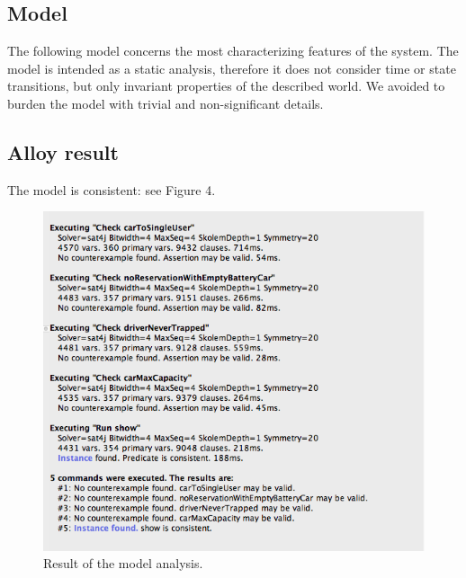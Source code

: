 \subsection{Model}
The following model concerns the most characterizing features of the system. The model is intended as a static analysis, therefore it does not consider time or state transitions, but only invariant properties of the described world.
We avoided to burden the model with trivial and non-significant details.



\subsection{Alloy result}
	The model is consistent: see Figure 4.
	\begin{figure}
		\includegraphics[width=\textwidth]{img/alloy_output.png}
		\caption{Result of the model analysis.}
		\label{figure 1}
	\end{figure}



